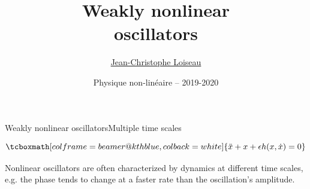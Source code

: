 \documentclass[usenames,dvipsnames,svgnames,10pt,aspectratio=169]{beamer}
\title[Nonlinear physics] %
{
  Weakly nonlinear \\ oscillators
}
\author[J.-Ch.~Loiseau] %
{
	\underline{Jean-Christophe Loiseau}
}
\institute[unused]
{
	\url{jean-christophe.loiseau@ensam.eu} \\
	Laboratoire DynFluid \\
	Arts et M\'etiers, France.
}
\date[unused]{Physique non-lin\'eaire -- 2019-2020}
\begin{document}
\titleframe	%


\begin{frame}[t, c]{Weakly nonlinear oscillators}{Multiple time scales}
  \begin{minipage}{.68\textwidth}
    \[
    \tcboxmath[colframe=beamer@kthblue, colback=white]{
      \ddot{x} + x + \epsilon h(x, \dot{x}) = 0
    }
    \]

    \bigskip

    Nonlinear oscillators are often characterized by dynamics at different time scales, e.g. the phase tends to change at a faster rate than the oscillation's amplitude.

  \end{minipage}%
  \hfill
  \begin{minipage}{.28\textwidth}
    \centering
  \end{minipage}
\end{frame}
\end{document}
